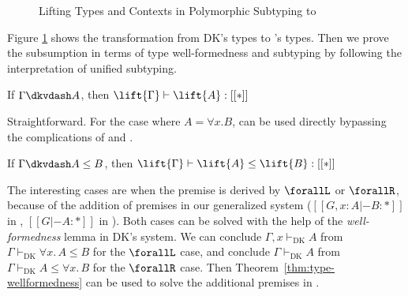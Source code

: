 \begin{figure}
    \caption{Lifting Types and Contexts in Polymorphic Subtyping to \name}
    \label{fig:lift}
\end{figure}
Figure \ref{fig:lift} shows the transformation from
DK's types to \name's types.
Then we prove the subsumption in terms of type well-formedness and subtyping
by following the interpretation of unified subtyping.

\begin{theorem}
\label{thm:type-wellformedness}
    If $\Gamma \dkvdash A$, then $\lift{\Gamma} \vdash \lift{A} : [[*]]$
\end{theorem}

Straightforward. For the case where $A = \forall x. B$,  can be
used directly bypassing the complications of  and
.

\begin{theorem}
    If $\Gamma \dkvdash A \le B$, then $\lift{\Gamma} \vdash \lift{A} \le \lift{B} : [[*]]$
\end{theorem}

The interesting cases are when the premise is derived by $\forallL$ or $\forallR$,
because of the addition of premises in our generalized system
($[[G, x : A |- B : *]]$ in , $[[G |- A : *]]$ in ).
Both cases can be solved with the help of the \emph{well-formedness} lemma in
DK's system. We can conclude $\Gamma, x \vdash_{\text{DK}} A$ from
$\Gamma \vdash_{\text{DK}} \forall x.\, A \le B$ for the $\forallL$ case,
and conclude $\Gamma \vdash_{\text{DK}} A$ from $\Gamma \vdash_{\text{DK}} A \le \forall x.\, B$ for the $\forallR$ case.
Then Theorem~\ref{thm:type-wellformedness} can be used to solve the additional
premises in \name.
